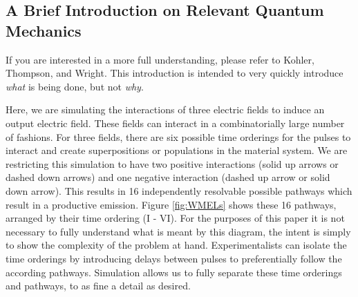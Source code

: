 \documentclass[fontsize=11pt]{scrartcl}
\numberwithin{equation}{section}		%
\numberwithin{figure}{section}			%
\numberwithin{table}{section}				%
\begin{document}
\subsection{A Brief Introduction on Relevant Quantum Mechanics}

If you are interested in a more full understanding, please refer to Kohler, Thompson, and Wright\cite{Kohler_2017}.
This introduction is intended to very quickly introduce \textit{what} is being done, but not \textit{why}.

Here, we are simulating the interactions of three electric fields to induce an output electric field.
These fields can interact in a combinatorially large number of fashions.
For three fields, there are six possible time orderings for the pulses to interact and create superpositions or populations in the material system.
We are restricting this simulation to have two positive interactions (solid up arrows or dashed down arrows) and one negative interaction (dashed up arrow or solid down arrow).
This results in 16 independently resolvable possible pathways which result in a productive emission.
Figure \ref{fig:WMELs} shows these 16 pathways, arranged by their time ordering (I - VI).
For the purposes of this paper it is not necessary to fully understand what is meant by this diagram, the intent is simply to show the complexity of the problem at hand.
Experimentalists can isolate the time orderings by introducing delays between pulses to preferentially follow the according pathways.
Simulation allows us to fully separate these time orderings and pathways, to as fine a detail as desired.
\end{document}
